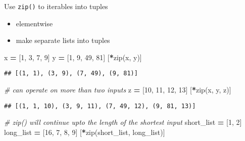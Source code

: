 \documentclass[
]{book}
\newenvironment{Shaded}{\begin{snugshade}}{\end{snugshade}}
\newcommand{\BuiltInTok}[1]{#1}
\newcommand{\CommentTok}[1]{\textcolor[rgb]{0.56,0.35,0.01}{\textit{#1}}}
\newcommand{\DecValTok}[1]{\textcolor[rgb]{0.00,0.00,0.81}{#1}}
\newcommand{\NormalTok}[1]{#1}
\newcommand{\OperatorTok}[1]{\textcolor[rgb]{0.81,0.36,0.00}{\textbf{#1}}}
\begin{document}
Use \texttt{zip()} to iterables into tuples

\begin{itemize}
\item
  elementwise
\item
  make separate lists into tuples
\end{itemize}

\begin{Shaded}
\begin{Highlighting}[]
\NormalTok{x }\OperatorTok{=}\NormalTok{ [}\DecValTok{1}\NormalTok{, }\DecValTok{3}\NormalTok{, }\DecValTok{7}\NormalTok{, }\DecValTok{9}\NormalTok{]}
\NormalTok{y }\OperatorTok{=}\NormalTok{ [}\DecValTok{1}\NormalTok{, }\DecValTok{9}\NormalTok{, }\DecValTok{49}\NormalTok{, }\DecValTok{81}\NormalTok{]}
\NormalTok{[}\OperatorTok{*}\BuiltInTok{zip}\NormalTok{(x, y)]}
\end{Highlighting}
\end{Shaded}

\begin{verbatim}
## [(1, 1), (3, 9), (7, 49), (9, 81)]
\end{verbatim}

\begin{Shaded}
\begin{Highlighting}[]
\CommentTok{\# can operate on more than two inputs}
\NormalTok{z }\OperatorTok{=}\NormalTok{ [}\DecValTok{10}\NormalTok{, }\DecValTok{11}\NormalTok{, }\DecValTok{12}\NormalTok{, }\DecValTok{13}\NormalTok{]}
\NormalTok{[}\OperatorTok{*}\BuiltInTok{zip}\NormalTok{(x, y, z)]}
\end{Highlighting}
\end{Shaded}

\begin{verbatim}
## [(1, 1, 10), (3, 9, 11), (7, 49, 12), (9, 81, 13)]
\end{verbatim}

\begin{Shaded}
\begin{Highlighting}[]
\CommentTok{\# zip() will continue upto the length of the shortest input}
\NormalTok{short\_list }\OperatorTok{=}\NormalTok{ [}\DecValTok{1}\NormalTok{, }\DecValTok{2}\NormalTok{]}
\NormalTok{long\_list }\OperatorTok{=}\NormalTok{ [}\DecValTok{16}\NormalTok{, }\DecValTok{7}\NormalTok{, }\DecValTok{8}\NormalTok{, }\DecValTok{9}\NormalTok{]}
\NormalTok{[}\OperatorTok{*}\BuiltInTok{zip}\NormalTok{(short\_list, long\_list)]}
\end{Highlighting}
\end{Shaded}
\end{document}
